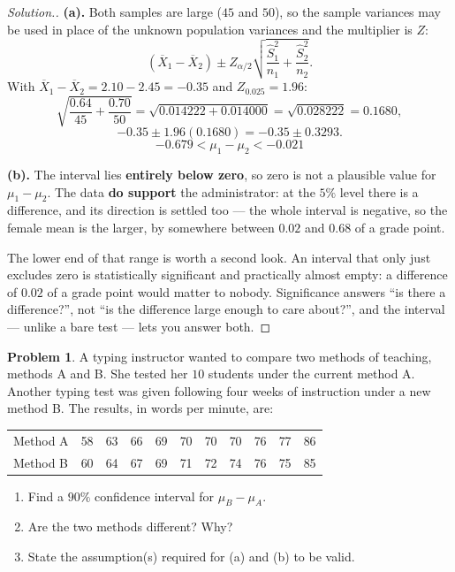 \documentclass[11pt,a4paper]{article}
\theoremstyle{definition}
\newtheorem{problemx}{Problem}[section]
\newenvironment{problem}{\begin{problemx}}{\end{problemx}}
\newenvironment{solution}
  {\renewcommand{\qedsymbol}{}\begin{proof}[\textit{Solution}.]}
  {\end{proof}}
\begin{document}
\begin{solution}
\textbf{(a).} Both samples are large ($45$ and $50$), so the sample variances may be used in
place of the unknown population variances and the multiplier is $Z$:
\[(\overline{X}_1-\overline{X}_2)\pm Z_{\alpha/2}
\sqrt{\frac{\hat{S}_1^2}{n_1}+\frac{\hat{S}_2^2}{n_2}}.\]
With $\overline{X}_1-\overline{X}_2=2.10-2.45=-0.35$ and $Z_{0.025}=1.96$:
\[\sqrt{\frac{0.64}{45}+\frac{0.70}{50}}=\sqrt{0.014222+0.014000}=\sqrt{0.028222}=0.1680,\]
\[-0.35\pm 1.96(0.1680)=-0.35\pm 0.3293.\]
\[-0.679<\mu_1-\mu_2<-0.021\]

\textbf{(b).} The interval lies \textbf{entirely below zero}, so zero is not a plausible
value for $\mu_1-\mu_2$. The data \textbf{do support} the administrator: at the $5\%$ level
there is a difference, and its direction is settled too --- the whole interval is negative,
so the female mean is the larger, by somewhere between $0.02$ and $0.68$ of a grade point.

The lower end of that range is worth a second look. An interval that only just excludes zero
is statistically significant and practically almost empty: a difference of $0.02$ of a grade
point would matter to nobody. Significance answers ``is there a difference?'', not ``is the
difference large enough to care about?'', and the interval --- unlike a bare test --- lets
you answer both.
\end{solution}

\begin{problem}
A typing instructor wanted to compare two methods of teaching, methods A and B. She tested
her $10$ students under the current method A. Another typing test was given following four
weeks of instruction under a new method B. The results, in words per minute, are:
\begin{table}[H]
\centering
\begin{tabular}{l|cccccccccc}
Method A & 58 & 63 & 66 & 69 & 70 & 70 & 70 & 76 & 77 & 86\\
Method B & 60 & 64 & 67 & 69 & 71 & 72 & 74 & 76 & 75 & 85\\
\end{tabular}
\end{table}
\begin{enumerate}
\item[(a).] Find a $90\%$ confidence interval for $\mu_B-\mu_A$.
\item[(b).] Are the two methods different? Why?
\item[(c).] State the assumption(s) required for (a) and (b) to be valid.
\end{enumerate}
\end{problem}
\end{document}

